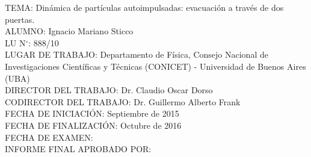 \begin{flushleft}
TEMA: Dinámica de partículas autoimpulsadas: evacuación a través de dos puertas.\\

ALUMNO: Ignacio Mariano Sticco\\

LU N$^{\circ}$: 888/10 \\

LUGAR DE TRABAJO: Departamento de Física, Consejo Nacional de Investigaciones Cient\'ificas y T\'ecnicas (CONICET) - Universidad de Buenos Aires (UBA)\\

DIRECTOR DEL TRABAJO: Dr. Claudio Oscar Dorso \\

CODIRECTOR DEL TRABAJO: Dr. Guillermo Alberto Frank\\

FECHA DE INICIACI\'ON: Septiembre de 2015 \\

FECHA DE FINALIZACI\'ON: Octubre de 2016\\

FECHA DE EXAMEN:  \\

INFORME FINAL APROBADO POR:
\end{flushleft}                                                              %
\vspace{2cm}

